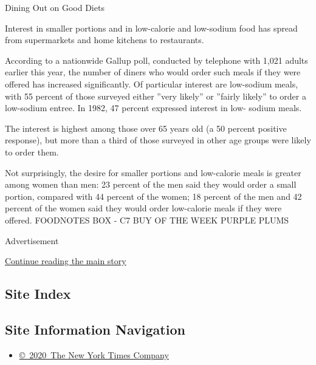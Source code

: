 Dining Out on Good Diets

Interest in smaller portions and in low-calorie and low-sodium food has
spread from supermarkets and home kitchens to restaurants.

According to a nationwide Gallup poll, conducted by telephone with 1,021
adults earlier this year, the number of diners who would order such
meals if they were offered has increased significantly. Of particular
interest are low-sodium meals, with 55 percent of those surveyed either
''very likely'' or ''fairly likely'' to order a low-sodium entree. In
1982, 47 percent expressed interest in low- sodium meals.

The interest is highest among those over 65 years old (a 50 percent
positive response), but more than a third of those surveyed in other age
groups were likely to order them.

Not surprisingly, the desire for smaller portions and low-calorie meals
is greater among women than men: 23 percent of the men said they would
order a small portion, compared with 44 percent of the women; 18 percent
of the men and 42 percent of the women said they would order low-calorie
meals if they were offered. FOODNOTES BOX - C7 BUY OF THE WEEK PURPLE
PLUMS

Advertisement

\protect\hyperlink{after-bottom}{Continue reading the main story}

\hypertarget{site-index}{%
\subsection{Site Index}\label{site-index}}

\hypertarget{site-information-navigation}{%
\subsection{Site Information
Navigation}\label{site-information-navigation}}

\begin{itemize}
\tightlist
\item
  \href{https://help.nytimes3xbfgragh.onion/hc/en-us/articles/115014792127-Copyright-notice}{©~2020~The
  New York Times Company}
\end{itemize}

